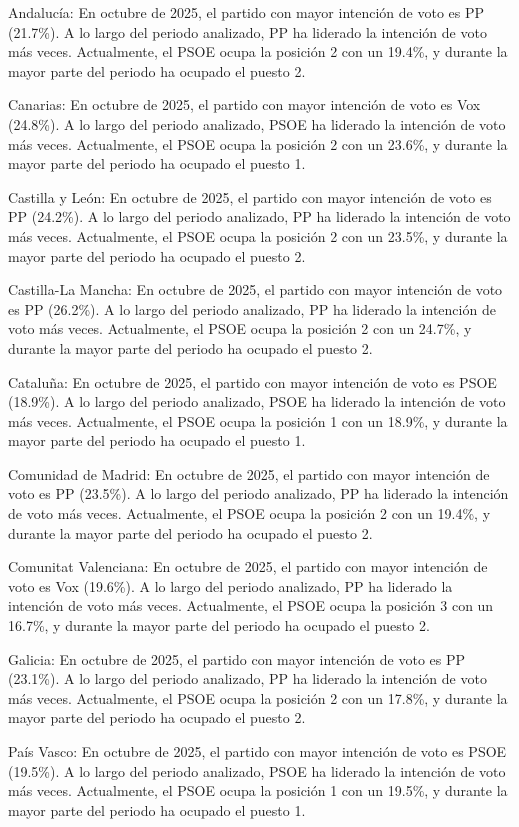 \documentclass[
  letterpaper,
  DIV=11,
  numbers=noendperiod]{scrreprt}
\begin{document}
Andalucía: En octubre de 2025, el partido con mayor intención de voto es
PP (21.7\%). A lo largo del periodo analizado, PP ha liderado la
intención de voto más veces. Actualmente, el PSOE ocupa la posición 2
con un 19.4\%, y durante la mayor parte del periodo ha ocupado el puesto
2.

Canarias: En octubre de 2025, el partido con mayor intención de voto es
Vox (24.8\%). A lo largo del periodo analizado, PSOE ha liderado la
intención de voto más veces. Actualmente, el PSOE ocupa la posición 2
con un 23.6\%, y durante la mayor parte del periodo ha ocupado el puesto
1.

Castilla y León: En octubre de 2025, el partido con mayor intención de
voto es PP (24.2\%). A lo largo del periodo analizado, PP ha liderado la
intención de voto más veces. Actualmente, el PSOE ocupa la posición 2
con un 23.5\%, y durante la mayor parte del periodo ha ocupado el puesto
2.

Castilla-La Mancha: En octubre de 2025, el partido con mayor intención
de voto es PP (26.2\%). A lo largo del periodo analizado, PP ha liderado
la intención de voto más veces. Actualmente, el PSOE ocupa la posición 2
con un 24.7\%, y durante la mayor parte del periodo ha ocupado el puesto
2.

Cataluña: En octubre de 2025, el partido con mayor intención de voto es
PSOE (18.9\%). A lo largo del periodo analizado, PSOE ha liderado la
intención de voto más veces. Actualmente, el PSOE ocupa la posición 1
con un 18.9\%, y durante la mayor parte del periodo ha ocupado el puesto
1.

Comunidad de Madrid: En octubre de 2025, el partido con mayor intención
de voto es PP (23.5\%). A lo largo del periodo analizado, PP ha liderado
la intención de voto más veces. Actualmente, el PSOE ocupa la posición 2
con un 19.4\%, y durante la mayor parte del periodo ha ocupado el puesto
2.

Comunitat Valenciana: En octubre de 2025, el partido con mayor intención
de voto es Vox (19.6\%). A lo largo del periodo analizado, PP ha
liderado la intención de voto más veces. Actualmente, el PSOE ocupa la
posición 3 con un 16.7\%, y durante la mayor parte del periodo ha
ocupado el puesto 2.

Galicia: En octubre de 2025, el partido con mayor intención de voto es
PP (23.1\%). A lo largo del periodo analizado, PP ha liderado la
intención de voto más veces. Actualmente, el PSOE ocupa la posición 2
con un 17.8\%, y durante la mayor parte del periodo ha ocupado el puesto
2.

País Vasco: En octubre de 2025, el partido con mayor intención de voto
es PSOE (19.5\%). A lo largo del periodo analizado, PSOE ha liderado la
intención de voto más veces. Actualmente, el PSOE ocupa la posición 1
con un 19.5\%, y durante la mayor parte del periodo ha ocupado el puesto
1.
\end{document}
